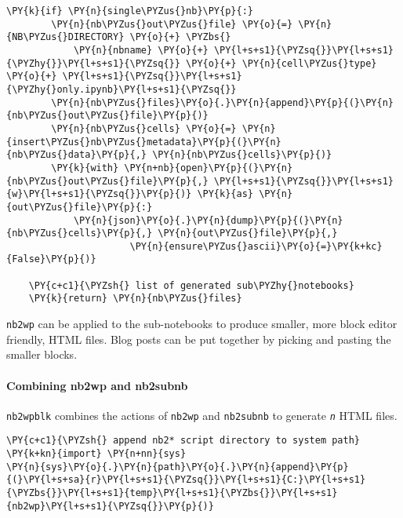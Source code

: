 \begin{tcolorbox}[breakable, size=fbox, boxrule=1pt, pad at break*=1mm,colback=cellbackground, colframe=cellborder]
\begin{Verbatim}[commandchars=\\\{\}]
    \PY{k}{if} \PY{n}{single\PYZus{}nb}\PY{p}{:}
        \PY{n}{nb\PYZus{}out\PYZus{}file} \PY{o}{=} \PY{n}{NB\PYZus{}DIRECTORY} \PY{o}{+} \PYZbs{}
            \PY{n}{nbname} \PY{o}{+} \PY{l+s+s1}{\PYZsq{}}\PY{l+s+s1}{\PYZhy{}}\PY{l+s+s1}{\PYZsq{}} \PY{o}{+} \PY{n}{cell\PYZus{}type} \PY{o}{+} \PY{l+s+s1}{\PYZsq{}}\PY{l+s+s1}{\PYZhy{}only.ipynb}\PY{l+s+s1}{\PYZsq{}}
        \PY{n}{nb\PYZus{}files}\PY{o}{.}\PY{n}{append}\PY{p}{(}\PY{n}{nb\PYZus{}out\PYZus{}file}\PY{p}{)}
        \PY{n}{nb\PYZus{}cells} \PY{o}{=} \PY{n}{insert\PYZus{}nb\PYZus{}metadata}\PY{p}{(}\PY{n}{nb\PYZus{}data}\PY{p}{,} \PY{n}{nb\PYZus{}cells}\PY{p}{)}
        \PY{k}{with} \PY{n+nb}{open}\PY{p}{(}\PY{n}{nb\PYZus{}out\PYZus{}file}\PY{p}{,} \PY{l+s+s1}{\PYZsq{}}\PY{l+s+s1}{w}\PY{l+s+s1}{\PYZsq{}}\PY{p}{)} \PY{k}{as} \PY{n}{out\PYZus{}file}\PY{p}{:}
            \PY{n}{json}\PY{o}{.}\PY{n}{dump}\PY{p}{(}\PY{n}{nb\PYZus{}cells}\PY{p}{,} \PY{n}{out\PYZus{}file}\PY{p}{,} 
                      \PY{n}{ensure\PYZus{}ascii}\PY{o}{=}\PY{k+kc}{False}\PY{p}{)}

    \PY{c+c1}{\PYZsh{} list of generated sub\PYZhy{}notebooks}
    \PY{k}{return} \PY{n}{nb\PYZus{}files}
\end{Verbatim}
\end{tcolorbox}

    \texttt{nb2wp} can be applied to the sub-notebooks to produce smaller,
more block editor friendly, HTML files. Blog posts can be put together
by picking and pasting the smaller blocks.

    \hypertarget{combining-nb2wp-and-nb2subnb}{%
\paragraph{Combining nb2wp and
nb2subnb}\label{combining-nb2wp-and-nb2subnb}}

    \texttt{nb2wpblk} combines the actions of \texttt{nb2wp} and
\texttt{nb2subnb} to generate \emph{\texttt{n}} HTML files.

    \begin{tcolorbox}[breakable, size=fbox, boxrule=1pt, pad at break*=1mm,colback=cellbackground, colframe=cellborder]
\begin{Verbatim}[commandchars=\\\{\}]
\PY{c+c1}{\PYZsh{} append nb2* script directory to system path}
\PY{k+kn}{import} \PY{n+nn}{sys}
\PY{n}{sys}\PY{o}{.}\PY{n}{path}\PY{o}{.}\PY{n}{append}\PY{p}{(}\PY{l+s+sa}{r}\PY{l+s+s1}{\PYZsq{}}\PY{l+s+s1}{C:}\PY{l+s+s1}{\PYZbs{}}\PY{l+s+s1}{temp}\PY{l+s+s1}{\PYZbs{}}\PY{l+s+s1}{nb2wp}\PY{l+s+s1}{\PYZsq{}}\PY{p}{)}
\end{Verbatim}
\end{tcolorbox}

